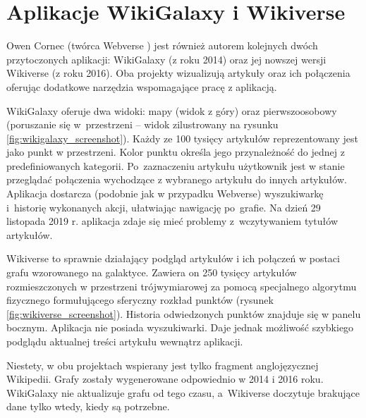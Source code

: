 \section{Aplikacje WikiGalaxy i Wikiverse}

Owen Cornec (twórca Webverse \cite{Webverse}) jest również autorem kolejnych dwóch przytoczonych aplikacji: WikiGalaxy \cite{WikiGalaxy} (z roku 2014) oraz jej nowszej wersji Wikiverse \cite{Wikiverse} (z roku 2016). Oba projekty wizualizują artykuły oraz ich połączenia oferując dodatkowe narzędzia wspomagające pracę z aplikacją.

WikiGalaxy oferuje dwa widoki: mapy (widok z góry) oraz pierwszoosobowy (poruszanie się w~przestrzeni – widok zilustrowany na rysunku \ref{fig:wikigalaxy_screenshot}). Każdy ze 100 tysięcy artykułów reprezentowany jest jako punkt w przestrzeni. Kolor punktu określa jego przynależność do jednej z predefiniowanych kategorii. Po~zaznaczeniu artykułu użytkownik jest w stanie przeglądać połączenia wychodzące z wybranego artykułu do innych artykułów. Aplikacja dostarcza (podobnie jak w przypadku Webverse) wyszukiwarkę i~historię wykonanych akcji, ułatwiając nawigację po~grafie. Na dzień 29 listopada 2019 r. aplikacja zdaje się mieć problemy z~wczytywaniem tytułów artykułów.


Wikiverse to sprawnie działający podgląd artykułów i ich połączeń w postaci grafu wzorowanego na galaktyce. Zawiera on 250 tysięcy artykułów rozmieszczonych w przestrzeni trójwymiarowej za pomocą specjalnego algorytmu fizycznego formułującego sferyczny rozkład punktów (rysunek \ref{fig:wikiverse_screenshot}). Historia odwiedzonych punktów znajduje się w panelu bocznym. Aplikacja nie posiada wyszukiwarki. Daje jednak możliwość szybkiego podglądu aktualnej treści artykułu wewnątrz aplikacji.

Niestety, w obu projektach wspierany jest tylko fragment anglojęzycznej Wikipedii. Grafy zostały wygenerowane odpowiednio w 2014 i 2016 roku. WikiGalaxy nie aktualizuje grafu od tego czasu, a~Wikiverse doczytuje brakujące dane tylko wtedy, kiedy są potrzebne.


